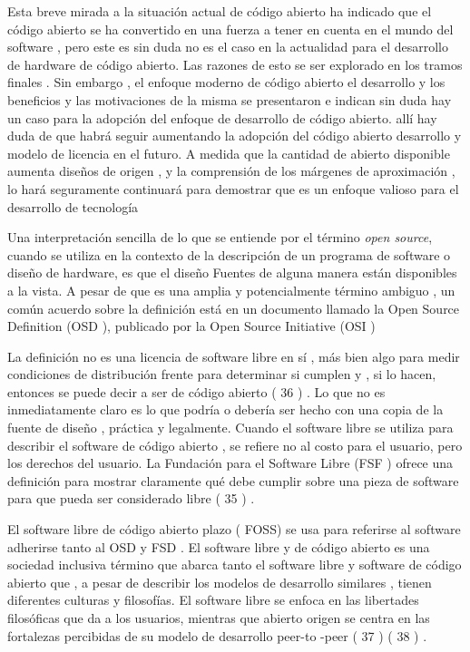 \documentclass[a4paper,11pt]{article}
\begin{document}
Esta breve mirada a la situación actual de código abierto ha indicado que el código abierto
se ha convertido en una fuerza a tener en cuenta en el mundo del software , pero este es sin duda
no es el caso en la actualidad para el desarrollo de hardware de código abierto. Las razones de esto se
ser explorado en los tramos finales . Sin embargo , el enfoque moderno de código abierto
el desarrollo y los beneficios y las motivaciones de la misma se presentaron e indican
sin duda hay un caso para la adopción del enfoque de desarrollo de código abierto. allí
hay duda de que habrá seguir aumentando la adopción del código abierto
desarrollo y modelo de licencia en el futuro. A medida que la cantidad de abierto disponible
aumenta diseños de origen , y la comprensión de los márgenes de aproximación , lo hará
seguramente continuará para demostrar que es un enfoque valioso para el desarrollo de
tecnología

Una interpretación sencilla de lo que se entiende por el término \textit{open source}, cuando se utiliza en la contexto de la descripción de un programa de software o diseño de hardware, es que el diseño Fuentes de alguna manera están disponibles a la vista. A pesar de que es una amplia y potencialmente término ambiguo , un común acuerdo sobre la definición está en un documento llamado la Open Source Definition (OSD ), publicado por la Open Source Initiative (OSI ) 

La definición no es una licencia de software libre en sí , más bien algo para medir condiciones de distribución frente para determinar si cumplen y , si lo hacen, entonces se puede decir a ser de código abierto ( 36 ) . Lo que no es inmediatamente claro es lo que podría o debería ser hecho con una copia de la fuente de diseño , práctica y legalmente. Cuando el software libre se utiliza para describir el software de código abierto , se refiere no al costo para el usuario, pero los derechos del usuario. La Fundación para el Software Libre (FSF ) ofrece una definición para mostrar claramente qué debe cumplir sobre una pieza de software para que pueda ser considerado libre ( 35 ) .

El software libre de código abierto plazo ( FOSS) se usa para referirse al software adherirse tanto al OSD y FSD . El software libre y de código abierto es una sociedad inclusiva término que abarca tanto el software libre y software de código abierto que , a pesar de describir los modelos de desarrollo similares , tienen diferentes culturas y filosofías.
El software libre se enfoca en las libertades filosóficas que da a los usuarios, mientras que abierto origen se centra en las fortalezas percibidas de su modelo de desarrollo peer-to -peer ( 37 ) ( 38 ) .
\end{document}
